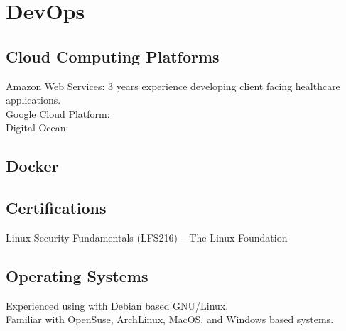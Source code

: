 \section{DevOps}

\subsection{Cloud Computing Platforms}
Amazon Web Services: 3 years experience developing client facing healthcare applications.\\
Google Cloud Platform: \\
Digital Ocean: \\

\subsection{Docker}

\subsection{Certifications}
Linux Security Fundamentals (LFS216) -- The Linux Foundation

\subsection{Operating Systems}
Experienced using with Debian based GNU/Linux.\\
Familiar with OpenSuse, ArchLinux, MacOS, and Windows based systems.\\
